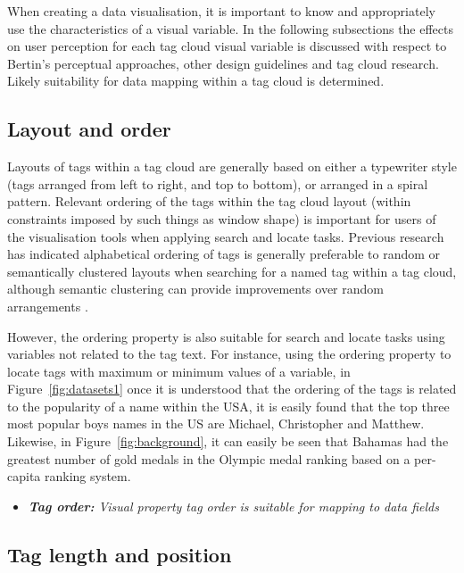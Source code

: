 When creating a data visualisation, it is important to know and appropriately use the characteristics of a visual variable. In the following subsections the effects on user perception for each tag cloud visual variable is discussed with respect to Bertin's perceptual approaches, other design guidelines and tag cloud research. Likely suitability for data mapping within a tag cloud is determined.

\subsection{Layout and order}\label{sub:layout}

Layouts of tags within a tag cloud are generally based on either a typewriter style (tags arranged from left to right, and top to bottom), or arranged in a spiral pattern. Relevant ordering of the tags within the tag cloud layout (within constraints imposed by such things as window shape) is important for users of the visualisation tools when applying search and locate tasks. Previous research has indicated alphabetical ordering of tags is generally preferable to random or semantically clustered layouts when searching for a named tag within a tag cloud, although semantic clustering can provide improvements over random arrangements \citep[][]{halvey07, schrammel09}. 

However, the ordering property is also suitable for search and locate tasks using variables not related to the tag text. For instance, using the ordering property to locate tags with maximum or minimum values of a variable, in Figure~\vref{fig:datasets1} once it is understood that the ordering of the tags is related to the popularity of a name within the USA, it is easily found that the top three most popular boys names in the US are Michael, Christopher and Matthew. Likewise, in Figure~\vref{fig:background}, it can easily be seen that Bahamas had the greatest number of gold medals in the Olympic medal ranking based on a per-capita ranking system.

\begin{itemize}
	\item \emph{\textbf{Tag order:} Visual property tag order is suitable for mapping to data fields}
\end{itemize}

\subsection{Tag length and position} 

